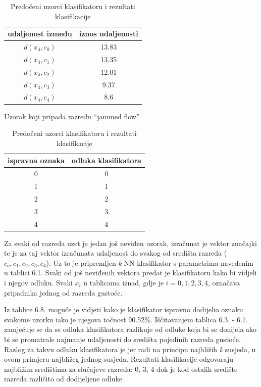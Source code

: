 \documentclass[times, utf8, zavrsni]{fer}
\begin{document}
\vspace{-1.5em}
\begin{table}[!ht]
\parbox{.45\linewidth}{
\centering
\begin{tabular}{c|c}
udaljenost između & iznos udaljenosti \\
\hline
\(d(x_4, c_0)\) & 13.83 \\
\(d(x_4, c_1)\) & 13.35 \\
\(d(x_4, c_2)\) & 12.01 \\
\(d(x_4, c_3)\) & 9.37 \\
\(d(x_4, c_4)\) & 8.6 \\
\end{tabular}
\caption{Uzorak koji pripada razredu \enquote{jammed flow}}
}
\hfill
\parbox{.45\linewidth}{
\centering
\begin{tabular}{c|c}
ispravna oznaka & odluka klasifikatora \\
\hline
0 & 0 \\
1 & 1 \\
2 & 2 \\
3 & 3 \\
4 & 4 \\
\end{tabular}
\caption{Predočeni uzorci klasifikatoru i rezultati klasifikacije}
}
\end{table}

Za svaki od razreda uzet je jedan još neviđen uzorak, izračunat je vektor značajki te je  za taj vektor
 izračunata udaljenost do svakog od središta razreda (\(c_o, c_1, c_2, c_3, c_4\)). Uz to je pripremljen 
\textit{k}-NN klasifikator s parametrima navedenim u tablici 6.1. Svaki od još neviđenih vektora
predat je klasifikatoru kako bi vidjeli i njegov odluku. Svaki \(x_i\) u tablicama iznad, gdje je \(i=0,1,2,3,4\),
označava pripadnika jednog od razreda gustoće.

\bigbreak

Iz tablice 6.8. moguće je vidjeti kako je klasifikator ispravno dodijelio oznaku svakome uzorku iako
je njegova točnost 90.52\%. Iščitavanjem tablica 6.3. - 6.7. zamjećuje se da se odluka klasifikatora
razlikuje od odluke koja bi se donijela ako bi se promatrale najmanje udaljenosti do središta pojedinih 
razreda gustoće. Razlog za takvu odluku klasifikatora je jer radi na principu najbližih \textit{k} 
susjeda, u ovom primjeru najbližeg jednog susjeda. Rezultati klasifikacije odgovaraju
najbližim središtima za slučajeve razreda: 0, 3, 4 dok je kod ostalih središte razreda različito od
dodijeljene odluke. 
\end{document}
